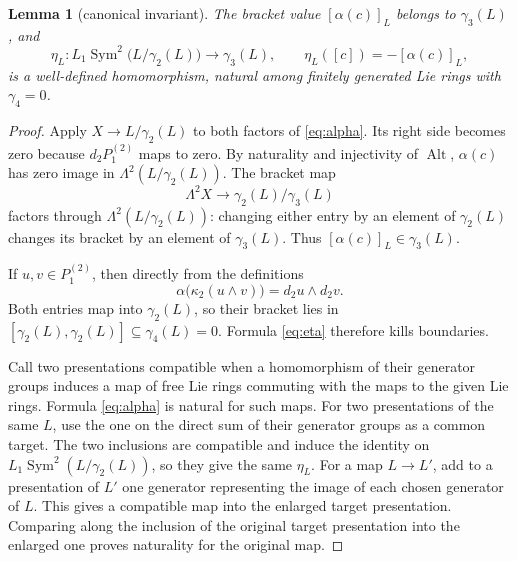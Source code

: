\documentclass[11pt]{amsart}
\newtheorem{lemma}[theorem]{Lemma}
\newcommand{\Sym}{\operatorname{Sym}}
\newcommand{\gm}{\gamma}
\newcommand{\Alt}{\operatorname{Alt}}
\begin{document}
\begin{lemma}[canonical invariant]\label{lem:eta}
The bracket value $[\alpha(c)]_L$ belongs to $\gm_3(L)$, and
\begin{equation}\label{eq:eta}
 \eta_L:L_1\Sym^2\bigl(L/\gm_2(L)\bigr)\longrightarrow\gm_3(L),
 \qquad \eta_L([c])=-[\alpha(c)]_L,
\end{equation}
is a well-defined homomorphism, natural among finitely generated Lie
rings with $\gm_4=0$.
\end{lemma}

\begin{proof}
Apply $X\to L/\gm_2(L)$ to both factors of \eqref{eq:alpha}.  Its
right side becomes zero because $d_2P^{(2)}_1$ maps to zero.  By
naturality and injectivity of $\Alt$,
$\alpha(c)$ has zero image in
$\Lambda^2(L/\gm_2(L))$.  The bracket map
\[
 \Lambda^2X\longrightarrow\gm_2(L)/\gm_3(L)
\]
factors through $\Lambda^2(L/\gm_2(L))$: changing either entry by an
element of $\gm_2(L)$ changes its bracket by an element of
$\gm_3(L)$.  Thus $[\alpha(c)]_L\in\gm_3(L)$.

If $u,v\in P^{(2)}_1$, then directly from the definitions
\[
 \alpha\bigl(\kappa_2(u\wedge v)\bigr)=d_2u\wedge d_2v.
\]
Both entries map into $\gm_2(L)$, so their bracket lies in
$[\gm_2(L),\gm_2(L)]\subseteq\gm_4(L)=0$.  Formula \eqref{eq:eta}
therefore kills boundaries.

Call two presentations compatible when a homomorphism of their
generator groups induces a map of free Lie rings commuting with the
maps to the given Lie rings.  Formula \eqref{eq:alpha} is natural for
such maps.  For two presentations of the same $L$, use the one on the
direct sum of their generator groups as a common target.  The two
inclusions are compatible and induce the identity on
$L_1\Sym^2(L/\gm_2(L))$, so they give the same $\eta_L$.  For a map
$L\to L'$, add to a presentation of $L'$ one generator representing
the image of each chosen generator of $L$.  This gives a compatible
map into the enlarged target presentation.  Comparing along the
inclusion of the original target presentation into the enlarged one
proves naturality for the original map.
\end{proof}
\end{document}
